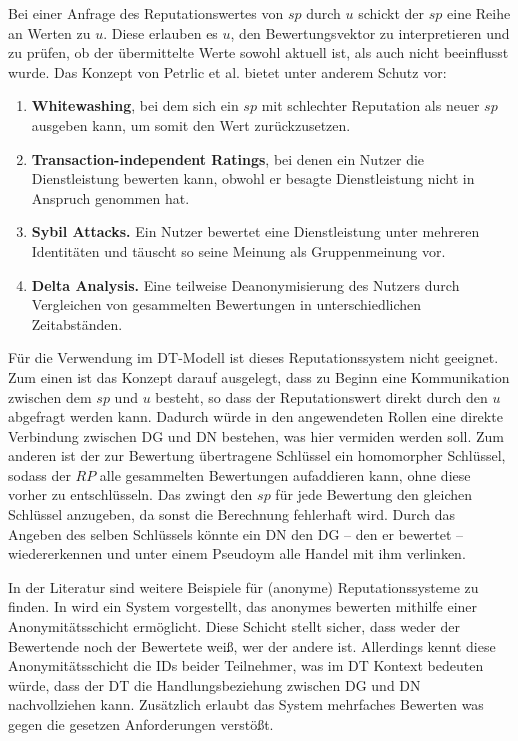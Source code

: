 \documentclass[
	fontsize=11pt,
	headings=small,
	parskip=half,           %
	bibliography=totoc,
	numbers=noenddot,       %
	open=any,               %
]{scrreprt}
\begin{document}
Bei einer Anfrage des Reputationswertes von $sp$ durch $u$ schickt der $sp$ eine Reihe an Werten zu $u$. Diese erlauben es $u$, den Bewertungsvektor zu interpretieren und zu prüfen, ob der übermittelte Werte sowohl aktuell ist, als auch nicht beeinflusst wurde. 
Das Konzept von Petrlic et al. bietet unter anderem Schutz vor: 
\begin{enumerate}
    \item \textbf{Whitewashing}, bei dem sich ein $sp$ mit schlechter Reputation als neuer $sp$ ausgeben kann, um somit den Wert zurückzusetzen.
    \item \textbf{Transaction-independent Ratings}, bei denen ein Nutzer die Dienstleistung bewerten kann, obwohl er besagte Dienstleistung nicht in Anspruch genommen hat.
    \item \textbf{Sybil Attacks.} Ein Nutzer bewertet eine Dienstleistung unter mehreren Identitäten und täuscht so seine Meinung als Gruppenmeinung vor.
    \item \textbf{Delta Analysis.} Eine teilweise Deanonymisierung des Nutzers durch Vergleichen von gesammelten Bewertungen in unterschiedlichen Zeitabständen.
\end{enumerate} 
Für die Verwendung im DT-Modell ist dieses Reputationssystem nicht geeignet. Zum einen ist das Konzept darauf ausgelegt, dass zu Beginn eine Kommunikation zwischen dem $sp$ und $u$ besteht, so dass der Reputationswert direkt durch den $u$ abgefragt werden kann. Dadurch würde in den angewendeten Rollen eine direkte Verbindung zwischen DG und DN bestehen, was hier vermiden werden soll. Zum anderen ist der zur Bewertung übertragene Schlüssel ein homomorpher Schlüssel, sodass der $RP$ alle gesammelten Bewertungen aufaddieren kann, ohne diese vorher zu entschlüsseln. Das zwingt den $sp$ für jede Bewertung den gleichen Schlüssel anzugeben, da sonst die Berechnung fehlerhaft wird. Durch das Angeben des selben Schlüssels könnte ein DN den DG -- den er bewertet -- wiedererkennen und unter einem Pseudoym alle Handel mit ihm verlinken.

In der Literatur sind weitere Beispiele für (anonyme) Reputationssysteme zu finden. In \cite{rep-muller2008sybil} wird ein System vorgestellt, das anonymes bewerten mithilfe einer Anonymitätsschicht ermöglicht. Diese Schicht stellt sicher, dass weder der Bewertende noch der Bewertete weiß, wer der andere ist. Allerdings kennt diese Anonymitätsschicht die IDs beider Teilnehmer, was im DT Kontext bedeuten würde, dass der DT die Handlungsbeziehung zwischen DG und DN nachvollziehen kann. Zusätzlich erlaubt das System mehrfaches Bewerten was gegen die gesetzen Anforderungen verstößt.
\end{document}
